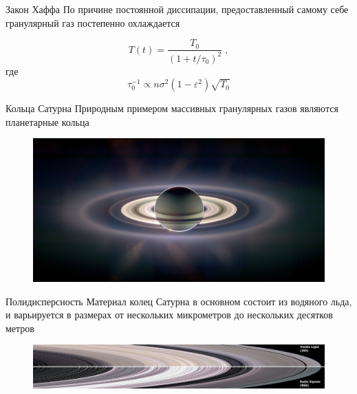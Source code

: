 \documentclass[10pt]{beamer}
\begin{document}
\begin{frame}[fragile]{Закон Хаффа}
  По причине постоянной диссипации, предоставленный самому себе гранулярный газ
  постепенно охлаждается

  \begin{equation}
    T(t)=\frac{T_0}{\left(1+t/\tau_0\right)^2}\;,
  \end{equation}
  где 
  \begin{equation}
    \tau_0^{-1}\propto n\sigma^2\left(1-\varepsilon^2\right)\sqrt{T_0}
  \end{equation}
\end{frame}

\begin{frame}[fragile]{Кольца Сатурна}
  Природным примером массивных гранулярных газов являются планетарные кольца 

  \begin{figure}[h]
    \centering
    \includegraphics[width=\textwidth]{newrings_cassini_big.jpg}    
    \label{fig:saturn_rings}
  \end{figure}
  
\end{frame}

\begin{frame}[fragile]{Полидисперсность}
  Материал колец Сатурна в основном состоит из водяного льда, и варьируется в размерах
  от нескольких микрометров до нескольких десятков метров 

  \begin{figure}[h]
    \centering
    \includegraphics[width=\textwidth]{1800px-Saturn's_rings_in_visible_light_and_radio.jpg}    
    \label{fig:ring_structure_gas}
  \end{figure}
\end{frame}
\end{document}
